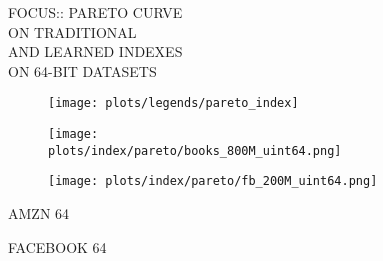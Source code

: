 \documentclass{article}
\begin{document}
\begin{figure}[!htbp]
\fbox
{
\begin{minipage}[t][0.98\textheight][t]{\textwidth}
\vspace*{-5px}
\centering
    \begin{minipage}{0.23\linewidth}
    \footnotesize{FOCUS::  PARETO CURVE \\ ON TRADITIONAL \\ AND LEARNED INDEXES \\ ON 64-BIT DATASETS}
    \end{minipage}
   \begin{minipage}{0.75\linewidth}
        \begin{figure}[H]
        \texttt{[image: plots/legends/pareto\_index]}
        \end{figure}
    \end{minipage}
    \vfill

   \begin{minipage}{0.48\linewidth}
        \begin{figure}[H]
        \texttt{[image: plots/index/pareto/books\_800M\_uint64.png]}
        \end{figure}
    \end{minipage}
    \begin{minipage}{0.48\linewidth}
        \begin{figure}[H]
        \texttt{[image: plots/index/pareto/fb\_200M\_uint64.png]}
        \end{figure}
    \end{minipage}
    \begin{minipage}{0.48\linewidth}
    \begin{center}
        AMZN 64
    \end{center}
    \end{minipage}
    \begin{minipage}{0.48\linewidth}
    \begin{center}
        FACEBOOK 64
    \end{center}
    \end{minipage}

    \vfill


\end{minipage}}
\end{figure}
\end{document}
